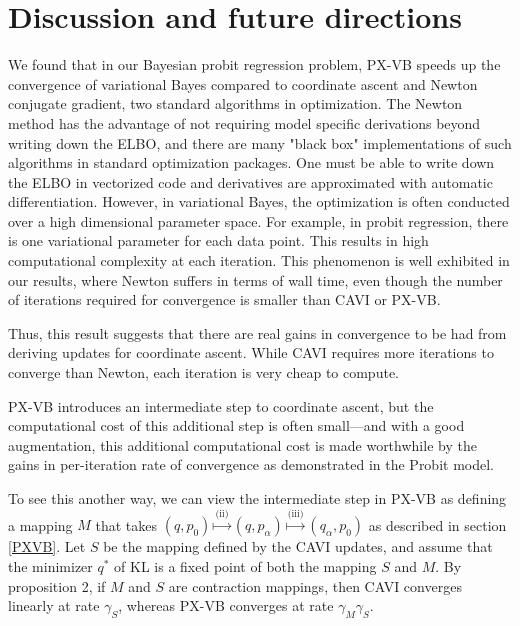 \documentclass{article}
\begin{document}
\section{Discussion and future directions}
We found that in our Bayesian probit regression problem, PX-VB speeds up the convergence of variational Bayes compared to coordinate ascent and Newton conjugate gradient, two standard algorithms in optimization. The Newton method has the advantage of not requiring model specific derivations beyond writing down the ELBO, and there are many "black box" implementations of such algorithms in standard optimization packages. One must be able to write down the ELBO in vectorized code and derivatives are approximated with automatic differentiation. However, in variational Bayes, the optimization is often conducted over a high dimensional parameter space. For example, in probit regression, there is one variational parameter for each data point. This results in high computational complexity at each iteration. This phenomenon is well exhibited in our results, where Newton suffers in terms of wall time, even though the number of iterations required for convergence is smaller than CAVI or PX-VB.%

Thus, this result suggests that there are real gains in convergence to be had from deriving updates for coordinate ascent. While CAVI requires more iterations to converge than Newton, each iteration is very cheap to compute. 

PX-VB introduces an intermediate step to coordinate ascent, but the computational cost of this additional step is often small---and with a good augmentation, this additional computational cost is made worthwhile by the gains in per-iteration rate of convergence as demonstrated in the Probit model.

To see this another way, we can view the intermediate step in PX-VB as defining a mapping $M$ that takes $(q, p_0) \stackrel{\text{(ii)}}{\mapsto} (q, p_\alpha) \stackrel{\text{(iii)}}{\mapsto} (q_\alpha, p_0)$ as described in section \ref{PXVB}. Let $S$ be the mapping defined by the CAVI updates, and assume that the minimizer $q^*$ of KL is a fixed point of both the mapping $S$ and $M$. By proposition 2, if $M$ and $S$ are contraction mappings, then CAVI converges linearly at rate $\gamma_S$, whereas PX-VB converges at rate $\gamma_M\gamma_S$. %
\end{document}
